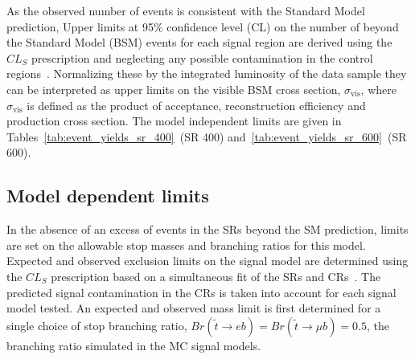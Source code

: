As the observed number of events is consistent with the Standard Model
prediction, Upper limits at 95\% confidence level (CL) on the number of
beyond the Standard Model (BSM) events for each signal region are derived
using the $CL_S$ prescription and neglecting any possible contamination in the
control regions~\cite{Baak:2014wma}.
Normalizing these by the integrated luminosity of the data sample they can be
interpreted as upper limits on the visible BSM cross section,
$\sigma_\mathrm{vis}$, where $\sigma_\mathrm{vis}$ is defined as the product of
acceptance, reconstruction efficiency and production cross section.
The model independent limits are given in
Tables~\ref{tab:event_yields_sr_400}~(SR 400)
and~\ref{tab:event_yields_sr_600}~(SR 600).

\FloatBarrier
\subsection{Model dependent limits}
\label{sec:model_dependent_limits}

In the absence of an excess of events in the SRs beyond the SM prediction,
limits are set on the allowable stop masses and branching ratios for this model.
Expected and observed exclusion limits on the signal model are determined using
the $CL_S$ prescription based on a simultaneous fit of the SRs and
CRs~\cite{Baak:2014wma}.
The predicted signal contamination in the CRs is taken into account for each
signal model tested.
An expected and observed mass limit is first determined for a single choice of
stop branching ratio, $Br(\tilde{t} \to eb) = Br(\tilde{t} \to \mu b) = 0.5$,
the branching ratio simulated in the MC signal models.

